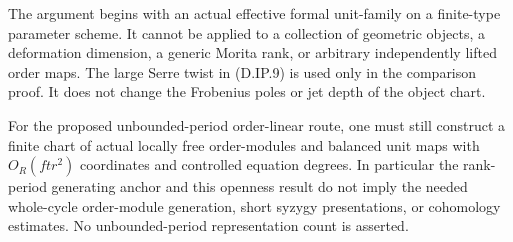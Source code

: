 \begin{remark}
The argument begins with an actual effective formal
unit-family on a finite-type parameter scheme.
It cannot be applied to a collection of geometric
objects, a deformation dimension, a generic Morita
rank, or arbitrary independently lifted order maps.
The large Serre twist in (D.IP.9) is used only in
the comparison proof. It does not change the
Frobenius poles or jet depth of the object chart.

For the proposed unbounded-period order-linear route,
one must still construct a finite chart of actual
locally free order-modules and balanced unit maps
with $O_R(ftr^2)$ coordinates and controlled equation
degrees. In particular the rank-period generating
anchor and this openness result do not imply the
needed whole-cycle order-module generation, short
syzygy presentations, or cohomology estimates.
No unbounded-period representation count is asserted.
\end{remark}
